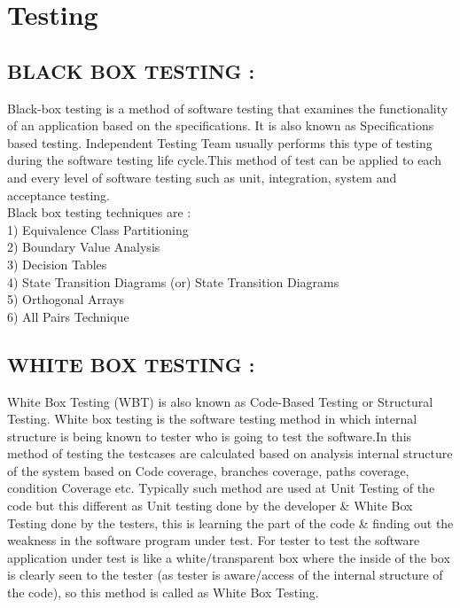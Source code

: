 \documentclass[10pt,a4paper]{article}
\begin{document}
\section{Testing}
\subsection{BLACK BOX TESTING : }
		 Black-box testing is a method of software testing that examines the functionality of an application based on the specifications. It is also known as Specifications based testing. Independent Testing Team usually performs this type of testing during the software testing life cycle.This method of test can be applied to each and every level of software testing such as unit, integration, system and acceptance testing.\\
		 Black box testing techniques are :\\
1) Equivalence Class Partitioning\\
2) Boundary Value Analysis\\
3) Decision Tables\\
4) State Transition Diagrams (or) State Transition Diagrams\\
5) Orthogonal Arrays\\
6) All Pairs Technique\\

\subsection{WHITE BOX TESTING :}
		 White Box Testing (WBT) is also known as Code-Based Testing or Structural Testing. White box testing is the software testing method in which internal structure is being known to tester who is going to test the software.In this method of testing the testcases are calculated based on analysis internal structure of the system based on Code coverage, branches coverage, paths coverage, condition Coverage etc. Typically such method are used at Unit Testing of the code but this different as Unit testing done by the developer \& White Box Testing done by the testers, this is learning the part of the code \& finding out the weakness in the software program under test.
For tester to test the software application under test is like a white/transparent box where the inside of the box is clearly seen to the tester (as tester is aware/access of the internal structure of the code), so this method is called as White Box Testing.
\end{document}
